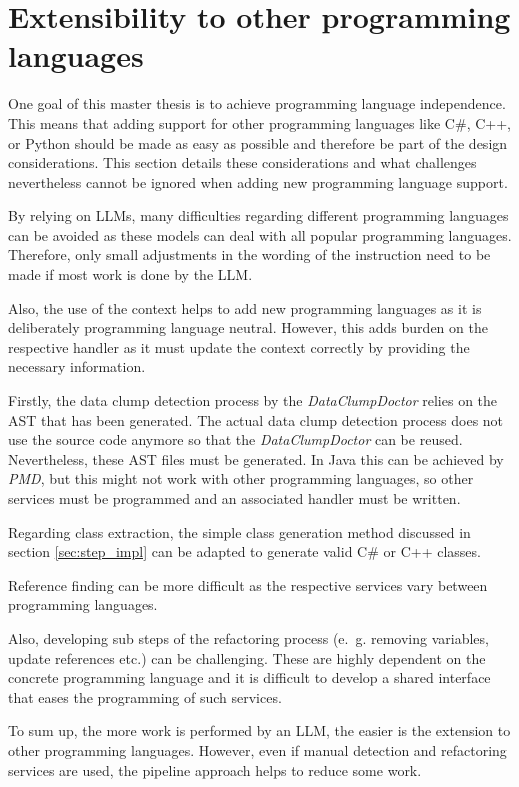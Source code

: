 \section{Extensibility to  other programming languages}\label{sec:lang_indep}

One goal of this master thesis is to achieve programming language independence. This means that adding support for other programming languages like  C\#, C++, or Python should be made as easy as possible and therefore be part of the design considerations. This section details these considerations and what challenges nevertheless cannot be ignored when adding new programming language support.

By relying on \acp{LLM}, many difficulties regarding different programming languages can be avoided as these models can deal  with all popular programming languages. Therefore, only small adjustments in the wording of the instruction need to be made if most work is done by the \ac{LLM}.

Also, the use of the context helps to add new programming languages as it is deliberately programming language neutral. However, this adds burden on the respective handler as it must update the context correctly by providing the necessary information. 

Firstly, the data clump detection process by the \textit{DataClumpDoctor} relies on the \ac{AST} that has been generated. The actual data clump detection process does not use the source code anymore so that the \textit{DataClumpDoctor} can be reused. Nevertheless, these \ac{AST} files must be generated. In Java this can be achieved by \textit{PMD}, but this might not work with other programming languages, so other services must be programmed and an associated handler must be written.

Regarding class extraction, the simple class generation method discussed in section \ref{sec:step_impl} can be adapted to generate valid C\# or C++ classes.

Reference finding can be more difficult as the respective services vary between programming languages.

Also, developing sub steps  of the refactoring process (e.~g. removing variables, update references etc.) can be challenging. These are highly dependent on the concrete programming language and it is difficult to develop a shared interface that eases the programming of such services.

To sum up, the more work is performed by an \ac{LLM}, the easier is the extension to other programming languages. However, even if manual detection and refactoring services are used, the pipeline approach helps to reduce some work.  

